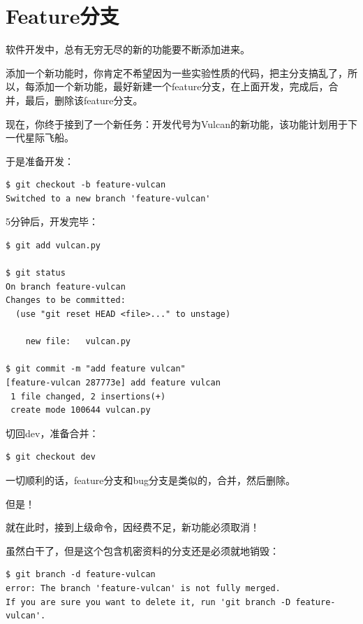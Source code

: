 \section{Feature分支}
软件开发中，总有无穷无尽的新的功能要不断添加进来。

添加一个新功能时，你肯定不希望因为一些实验性质的代码，把主分支搞乱了，所以，每添加一个新功能，最好新建一个feature分支，在上面开发，完成后，合并，最后，删除该feature分支。

现在，你终于接到了一个新任务：开发代号为Vulcan的新功能，该功能计划用于下一代星际飞船。

于是准备开发：

\begin{verbatim}
$ git checkout -b feature-vulcan
Switched to a new branch 'feature-vulcan'
\end{verbatim}

5分钟后，开发完毕：

\begin{verbatim}
$ git add vulcan.py

$ git status
On branch feature-vulcan
Changes to be committed:
  (use "git reset HEAD <file>..." to unstage)

	new file:   vulcan.py

$ git commit -m "add feature vulcan"
[feature-vulcan 287773e] add feature vulcan
 1 file changed, 2 insertions(+)
 create mode 100644 vulcan.py
\end{verbatim}

切回dev，准备合并：

\begin{verbatim}
$ git checkout dev
\end{verbatim}

一切顺利的话，feature分支和bug分支是类似的，合并，然后删除。

但是！

就在此时，接到上级命令，因经费不足，新功能必须取消！

虽然白干了，但是这个包含机密资料的分支还是必须就地销毁：

\begin{verbatim}
$ git branch -d feature-vulcan
error: The branch 'feature-vulcan' is not fully merged.
If you are sure you want to delete it, run 'git branch -D feature-vulcan'.
\end{verbatim}

